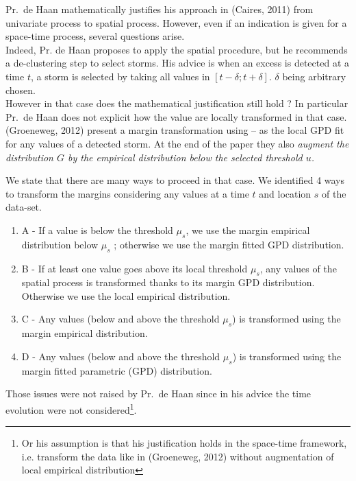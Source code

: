 Pr.~de Haan mathematically justifies his approach in (Caires, 2011) from univariate process to spatial process. However, even if an indication is given for a space-time process, several questions arise.\\
Indeed, Pr. de Haan proposes to apply the spatial procedure, but he recommends a de-clustering step to select storms. His advice is when an excess is detected at a time $t$, a storm is selected by taking all values in $[ t-\mathcal{\delta}; t+\mathcal{\delta}]$. $\delta$ being arbitrary chosen.\\
However in that case does the mathematical justification still hold ? In particular Pr.~de Haan does not explicit how the value are locally transformed in that case.\\
{\color{blue} (Groeneweg, 2012) present a margin transformation using -- as the local GPD fit for any values of a detected storm. At the end of the paper they also \textit{augment the distribution $G$ by the empirical distribution below the selected threshold $u$.}}\\
{\color{red} We state that there are many ways to proceed in that case. We identified 4 ways to transform the margins considering any values at a time $t$ and location $s$ of the data-set.
\begin{enumerate}
\item A - If a value is below the threshold $\mu_s$, we use the margin empirical distribution below $\mu_s$ ; otherwise we use the margin fitted GPD distribution.
\item B - If at least one value goes above its local threshold $\mu_s$, any values of the spatial process is transformed thanks to its margin GPD distribution. Otherwise we use the local empirical distribution.
\item C - Any values (below and above the threshold $\mu_s$) is transformed using the margin empirical distribution.
\item D - Any values (below and above the threshold $\mu_s$) is transformed using the margin fitted parametric (GPD) distribution.
\end{enumerate}
}
Those issues were not raised by Pr.~de Haan since in his advice the time evolution were not considered\footnote{Or his assumption is that his justification holds in the space-time framework, i.e. transform the data like in (Groeneweg, 2012) without augmentation of local empirical distribution}.\\

